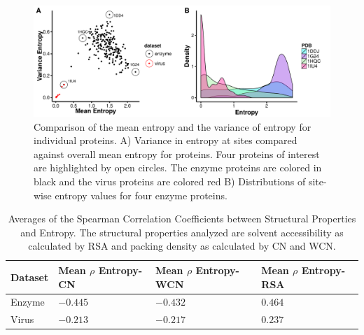 \documentclass[12pt]{article}
\begin{document}
 
 
        \begin{figure}[H]
            \centerline{\includegraphics[width=7.5in]{protein_ex_plot.pdf}}     
            \caption{Comparison of the mean entropy and the variance of entropy for individual proteins. A)  Variance in entropy at sites compared against overall mean entropy for proteins. Four proteins of interest are highlighted by open circles. The enzyme proteins are colored in black and the virus proteins are colored red B) Distributions of site-wise entropy values for four enzyme proteins. }
            \label{fig:protein_ex_plot}
    \end{figure}
     

\begin{center}
	\begin{table}[H]
	\begin{tabular}{| p{1.5cm} | p{2.5cm} | p{2cm} | p{2cm} | }
		\hline
		Dataset & Mean $\rho$ Entropy-CN  & Mean $\rho$ Entropy-WCN & Mean $\rho$ Entropy-RSA \\
		\hline	
		Enzyme &  $-0.445$  & $-0.432$ & $0.464$ \\
		\hline
		Virus & $-0.213$ & $-0.217$ & $0.237$ \\
		\hline	
	\end{tabular}
	\caption{Averages of the Spearman Correlation Coefficients between Structural Properties and Entropy. The structural properties analyzed are solvent accessibility as calculated by RSA and packing density as calculated by CN and WCN.}
	\label{table:entropy_stats}
	\end{table}
\end{center}
\end{document}
